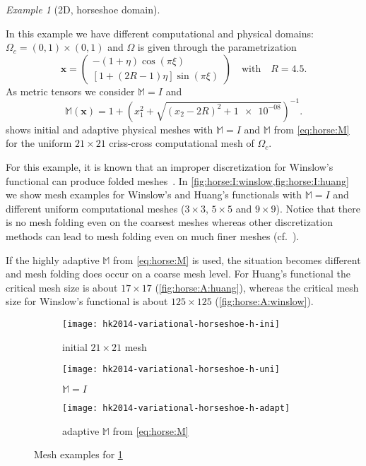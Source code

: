 \documentclass[american]{scrartcl}
\providecommand{\V}[1]{\boldsymbol{#1}}
\providecommand{\M}{\mathbb{M}}
\theoremstyle{remark}
\newtheorem{example}{\hspace{1ex}Example}[section]
\begin{document}
\begin{example}[2D, horseshoe domain]
\label{ex:horse}

In this example we have different computational and physical domains:$\Omega_c = (0,1) \times (0,1)$ and $\Omega$ is given through the parametrization  
\[
   \V{x} = \begin{pmatrix} 
      - \left(1+\eta \right) \cos\left(\pi \xi \right)\\
        \left[1 + \left(2R - 1\right) \eta \right] \sin\left(\pi\xi \right)
      \end{pmatrix}
      \quad \text{with} \quad
      R = 4.5.
\]
As metric tensors we consider $\M = I$ and
\begin{equation}
   \M(\V{x}) = 1 + {\left( x_1^2 + \sqrt{ {(x_2 - 2 R)}^2 + \num{1e-08} } \right)}^{-1}
   .
   \label{eq:horse:M}
\end{equation}
 shows initial and adaptive physical meshes with $\M = I$ and $\M$ from \cref{eq:horse:M} for the uniform $21 \times 21$ criss-cross computational mesh of $\Omega_c$.

For this example, it is known that an improper discretization for Winslow's functional can produce folded meshes~\cite{KL95b}.
In \cref{fig:horse:I:winslow,fig:horse:I:huang} we show mesh examples for Winslow's and Huang's functionals with $\M=I$ and different uniform computational meshes ($3 \times 3$, $5 \times 5$ and $9 \times 9$).
Notice that there is no mesh folding even on the coarsest meshes whereas other discretization methods can lead to mesh folding even on much finer meshes (cf.~\cite[Table~1]{KL95b}).

If the highly adaptive $\M$ from \cref{eq:horse:M} is used, the situation becomes different and mesh folding does occur on a coarse mesh level.
For Huang's functional the critical mesh size is about $17 \times 17$ (\cref{fig:horse:A:huang}), whereas the critical mesh size for Winslow's functional is about $125 \times 125$ (\cref{fig:horse:A:winslow}).

\begin{figure}[t]
   \begin{subfigure}[t]{0.31\linewidth}
      \texttt{[image: hk2014-variational-horseshoe-h-ini]}      \caption{initial $21 \times 21$ mesh}
   \end{subfigure}   \hfill   \begin{subfigure}[t]{0.31\linewidth}
      \texttt{[image: hk2014-variational-horseshoe-h-uni]}      \caption{$\M = I$}
   \end{subfigure}   \hfill   \begin{subfigure}[t]{0.31\linewidth}
      \texttt{[image: hk2014-variational-horseshoe-h-adapt]}      \caption{adaptive $\M$ from \cref{eq:horse:M}}
   \end{subfigure}
   \caption{      Mesh examples for \cref{ex:horse}
   }\label{fig:horse:huang}
\end{figure}


\end{example}
\end{document}
